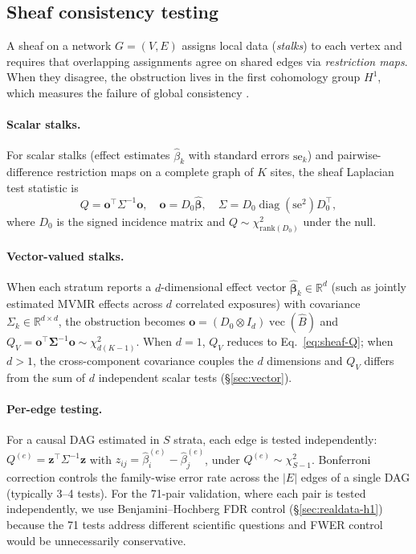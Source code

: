 \documentclass[11pt]{article}
\newcommand{\R}{\mathbb{R}}
\begin{document}
\subsection{Sheaf consistency testing}
\label{sec:meth-sheaf}

A sheaf on a network $G = (V, E)$ assigns local data (\emph{stalks}) to each vertex and requires that overlapping assignments agree on shared edges via \emph{restriction maps}.
When they disagree, the obstruction lives in the first cohomology group $H^1$, which measures the failure of global consistency \citep{curry2014sheaves, robinson2014topological, hansen2020laplacians}.

\paragraph{Scalar stalks.}
For scalar stalks (effect estimates $\hat\beta_k$ with standard errors $\mathrm{se}_k$) and pairwise-difference restriction maps on a complete graph of $K$ sites, the sheaf Laplacian test statistic is
\begin{equation}
    Q = \mathbf{o}^\top \Sigma^{-1} \mathbf{o}, \quad
    \mathbf{o} = D_0 \boldsymbol{\hat\beta}, \quad
    \Sigma = D_0 \operatorname{diag}(\mathrm{se}^2) D_0^\top,
    \label{eq:sheaf-Q}
\end{equation}
where $D_0$ is the signed incidence matrix and $Q \sim \chi^2_{\mathrm{rank}(D_0)}$ under the null.

\paragraph{Vector-valued stalks.}
When each stratum reports a $d$-dimensional effect vector $\hat{\boldsymbol{\beta}}_k \in \R^d$ (such as jointly estimated MVMR effects across $d$ correlated exposures) with covariance $\Sigma_k \in \R^{d \times d}$, the obstruction becomes $\mathbf{o} = (D_0 \otimes I_d) \operatorname{vec}(\hat{B})$ and $Q_V = \mathbf{o}^\top \boldsymbol{\Sigma}^{-1} \mathbf{o} \sim \chi^2_{d(K-1)}$. When $d = 1$, $Q_V$ reduces to Eq.~\ref{eq:sheaf-Q}; when $d > 1$, the cross-component covariance couples the $d$ dimensions and $Q_V$ differs from the sum of $d$ independent scalar tests (\S\ref{sec:vector}).

\paragraph{Per-edge testing.}
For a causal DAG estimated in $S$ strata, each edge is tested independently:
$Q^{(e)} = \mathbf{z}^\top \Sigma^{-1} \mathbf{z}$ with $z_{ij} = \hat\beta_i^{(e)} - \hat\beta_j^{(e)}$, under $Q^{(e)} \sim \chi^2_{S-1}$.
Bonferroni correction controls the family-wise error rate across the $|E|$ edges of a single DAG (typically 3--4 tests).
For the 71-pair validation, where each pair is tested independently, we use Benjamini--Hochberg FDR control (\S\ref{sec:realdata-h1}) because the 71 tests address different scientific questions and FWER control would be unnecessarily conservative.
\end{document}
